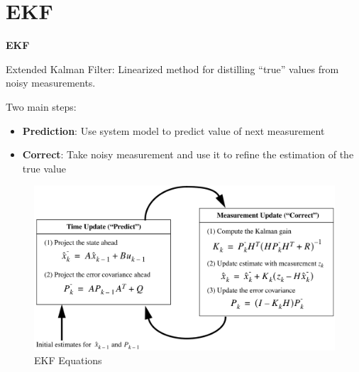 \documentclass[xcolor=dvipsnames]{beamer}
\begin{document}
  \section{EKF}
  \begin{frame}{\bf EKF}

    Extended Kalman Filter: Linearized method for distilling ``true''
    values from noisy measurements.
    
    Two main steps:
    \begin{itemize}
    \item {\bf Prediction}: Use system model to predict value of next
    measurement
    \item {\bf Correct}: Take noisy measurement and use it to refine the
      estimation of the true value
    \end{itemize}
    
    \begin{figure}
      \begin{center}
        \includegraphics[scale=.15]{ekf.png}
      \end{center}
      \caption{EKF Equations \cite{introekf}}
      \label{fig:ekfequations}
    \end{figure}

  \end{frame}

  {
    \begin{frame}{}
    \end{frame}
  }
  
\end{document}
